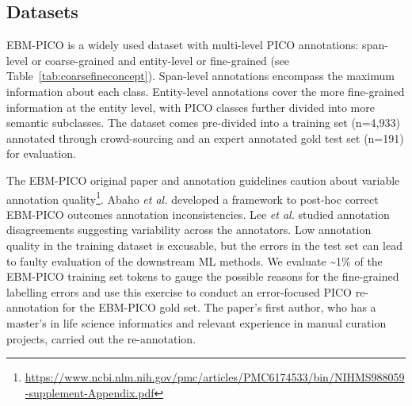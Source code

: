 \documentclass[10.7pt,]{article}
\begin{document}
\subsection{Datasets}\label{data}
%
EBM-PICO is a widely used dataset with multi-level PICO annotations: span-level or coarse-grained and entity-level or fine-grained (see Table~\ref{tab:coarsefineconcept}).
Span-level annotations encompass the maximum information about each class.
Entity-level annotations cover the more fine-grained information at the entity level, with PICO classes further divided into more semantic subclasses.
The dataset comes pre-divided into a training set (n=4,933) annotated through crowd-sourcing and an expert annotated gold test set (n=191) for evaluation.\cite{nye2018corpus}

The EBM-PICO original paper and annotation guidelines caution about variable annotation quality\footnote{\url{https://www.ncbi.nlm.nih.gov/pmc/articles/PMC6174533/bin/NIHMS988059-supplement-Appendix.pdf}}.
Abaho \textit{et al.} developed a framework to post-hoc correct EBM-PICO outcomes annotation inconsistencies.\cite{abaho2019correcting}
Lee \textit{et al.} studied annotation disagreements suggesting variability across the annotators.\cite{lee2019study}
Low annotation quality in the training dataset is excusable, but the errors in the test set can lead to faulty evaluation of the downstream ML methods.
We evaluate \textasciitilde1\% of the EBM-PICO training set tokens to gauge the possible reasons for the fine-grained labelling errors and use this exercise to conduct an error-focused PICO re-annotation for the EBM-PICO gold set.
The paper's first author, who has a master's in life science informatics and relevant experience in manual curation projects, carried out the re-annotation.
\end{document}
